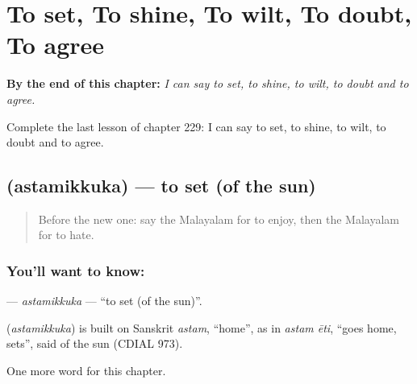 
\chapter{To set, To shine, To wilt, To doubt, To agree}
\label{ch:ml-to-set-to-shine-to-wilt-to-doubt-to-agree}

\begin{chapteropening}
\textbf{By the end of this chapter:} \emph{I can say to set, to shine, to wilt, to doubt and to agree.}

Complete the last lesson of chapter 229: I can say to set, to shine, to wilt, to doubt and to agree.
\end{chapteropening}

\section[\texorpdfstring{\ml{അസ്തമിക്കുക} (astamikkuka)}{അസ്തമിക്കുക (astamikkuka)}]{ (astamikkuka) — to set (of the sun)}

\label{lesson:ML-C229-astamikkuka}



\begin{quote}
Before the new one: say the Malayalam for to enjoy, then the Malayalam for to hate.
\end{quote}

\subsection*{You'll want to know: }
\textbf{} — \emph{astamikkuka} — \textquotedblleft{}to set (of the sun)\textquotedblright{}.

\begin{cousinweb}
\textbf{} (\emph{astamikkuka}) is built on Sanskrit \emph{astam}, \textquotedblleft{}home\textquotedblright{}, as in \emph{astam ēti}, \textquotedblleft{}goes home, sets\textquotedblright{}, said of the sun (CDIAL 973).
\end{cousinweb}

\begin{grammarlens}[title={What you've built}]
One more word for this chapter.
\end{grammarlens}


